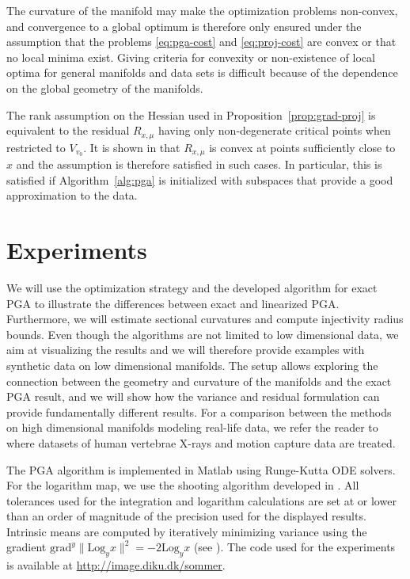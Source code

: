 \documentclass[final]{svjour3}
\newcommand{\grad}{\mathrm{grad}}
\newcommand{\Log}{\mathrm{Log}}
\begin{document}
The curvature of the manifold may make the optimization problems non-convex,
and convergence to a global optimum is therefore only
ensured under the assumption that the problems
\eqref{eq:pga-cost} and \eqref{eq:proj-cost} are convex or that no local minima
exist.  Giving criteria for convexity or non-existence of local optima for
general manifolds and data sets is 
difficult because of the dependence on the global geometry of the manifolds.

The rank assumption on the Hessian used in Proposition~\ref{prop:grad-proj} is
equivalent to the residual $R_{x,\mu}$ having only non-degenerate critical points when
restricted to $V_{v_0}$. 
It is shown in \cite{karcher_riemannian_1977} that $R_{x,\mu}$ is convex at points sufficiently
close to $x$ and the assumption is therefore satisfied in such cases. In
particular, this is satisfied if Algorithm~\ref{alg:pga} is initialized with
subspaces that provide a good approximation to the data.


\section{Experiments}
\label{sec:experiments}
We will use the optimization strategy and the developed algorithm for exact PGA
to illustrate the
differences between exact and linearized PGA. Furthermore, we will estimate sectional
curvatures and compute injectivity radius bounds.
Even though the algorithms are not limited to low dimensional data, we aim at visualizing the
results and we will therefore provide examples with synthetic data on low
dimensional manifolds. The setup allows exploring the connection between
the geometry and curvature of the manifolds and the exact PGA result, and we
will show how the variance and residual formulation can provide fundamentally
different results.
For a comparison between the methods on high dimensional 
manifolds modeling real-life data, we refer the reader to
\cite{sommer_manifold_2010} where datasets of
human vertebrae X-rays and motion capture data are treated.

The PGA algorithm is implemented in Matlab using 
Runge-Kutta ODE solvers. For the logarithm map, we use the shooting algorithm developed
in \cite{sommer_bicycle_2009}. All tolerances used for the integration and
logarithm calculations are set at or lower than an order of magnitude of the 
precision used for the displayed results. Intrinsic means are computed by
iteratively minimizing variance using the gradient $\grad^y\|\Log_yx\|^2=-2\Log_yx$ (see
\cite{karcher_riemannian_1977}). The code used for the experiments
is available at \url{http://image.diku.dk/sommer}.
\end{document}
